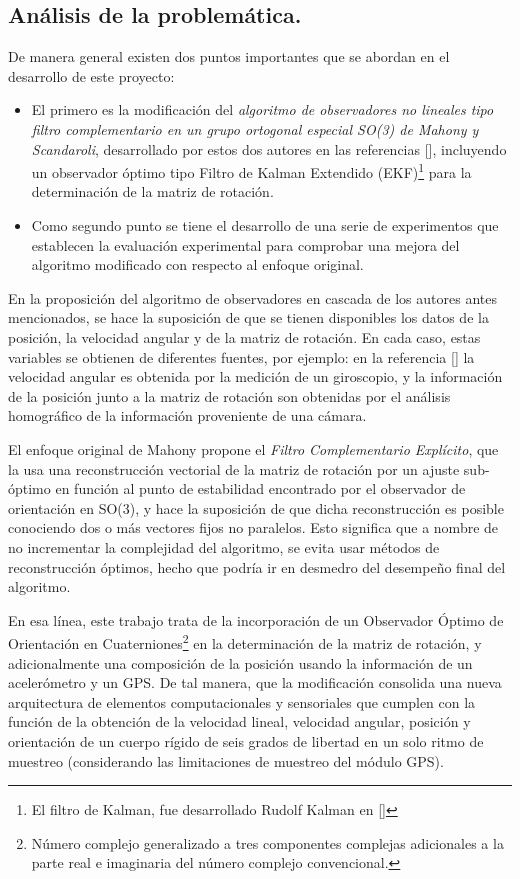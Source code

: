 \documentclass[10pt]{report}
\numberwithin{equation}{chapter}
\numberwithin{algorithm}{chapter}
\begin{document}
\subsection{Análisis de la problemática.}
De manera general existen dos puntos importantes que se abordan en el desarrollo de este proyecto:
\begin{itemize}
\item El primero es la modificación del \emph{algoritmo de observadores no lineales tipo filtro complementario en un grupo ortogonal especial SO(3) de Mahony y Scandaroli}, desarrollado por estos dos autores en las referencias [\cite{Mahony2008,Scandaro2011}], incluyendo un observador óptimo tipo Filtro de Kalman Extendido (EKF)\footnote{El filtro de Kalman, fue desarrollado Rudolf Kalman en [\cite{Kalman1960}]} para la determinación de la matriz de rotación.
\item Como segundo punto se tiene el desarrollo de una serie de experimentos que establecen la evaluación experimental para comprobar una mejora del algoritmo modificado con respecto al enfoque original. \end{itemize}
En la proposición del algoritmo de observadores en cascada de los autores antes mencionados, se hace la suposición de que se tienen disponibles los datos de la posición, la velocidad angular y de la matriz de rotación. En cada caso, estas variables se obtienen de diferentes fuentes, por ejemplo: en la referencia [\cite{Scandaro2011}] la velocidad angular es obtenida por la medición de un giroscopio, y la información de la posición junto a la matriz de rotación son obtenidas por el análisis homográfico de la información proveniente de una cámara.\par
El enfoque original de Mahony propone el \emph{Filtro Complementario Explícito}, que la usa una reconstrucción vectorial de la matriz de rotación por un ajuste sub-óptimo en función al punto de estabilidad encontrado por el observador de orientación en SO(3), y hace la suposición de que dicha reconstrucción es posible conociendo dos o más vectores fijos no paralelos. Esto significa que a nombre de no incrementar la complejidad del algoritmo, se evita usar métodos de reconstrucción óptimos, hecho que podría ir en desmedro del desempeño final del algoritmo. \par
En esa línea, este trabajo trata de la incorporación de un Observador Óptimo de Orientación en Cuaterniones\footnote{Número complejo generalizado a tres componentes complejas adicionales a la parte real e imaginaria del número complejo convencional.} en la determinación de la matriz de rotación, y adicionalmente una composición de la posición usando la información de un acelerómetro y un GPS. De tal manera, que la modificación consolida una nueva arquitectura de elementos computacionales y sensoriales que cumplen con la función de la obtención de la velocidad lineal, velocidad angular, posición y orientación de un cuerpo rígido de seis grados de libertad en un solo ritmo de muestreo (considerando las limitaciones de muestreo del módulo GPS).\par
\end{document}
